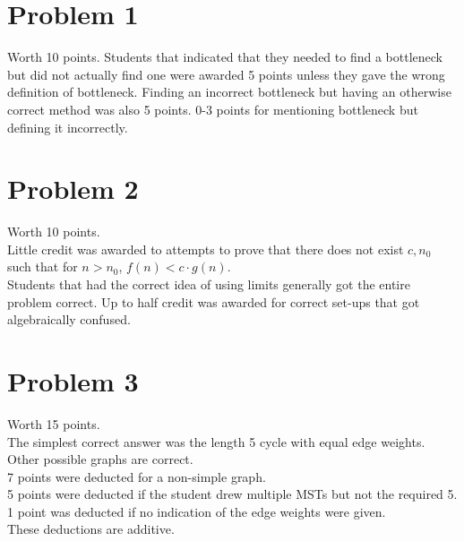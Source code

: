 \documentclass{article}
\begin{document}

\section*{Problem 1}
Worth 10 points. 
Students that indicated that they needed to find a bottleneck but did not actually find one were awarded 5 points unless they gave the wrong definition of bottleneck. Finding an incorrect bottleneck but having an otherwise correct method was also 5 points. 0-3 points for mentioning bottleneck but defining it incorrectly.

\section*{Problem 2}
Worth 10 points. \\
Little credit was awarded to attempts to prove that there does not exist $c, n_0$ such that for $n>n_0$, $f(n) < c\cdot g(n)$. \\
Students that had the correct idea of using limits generally got the entire problem correct. Up to half credit was awarded for correct set-ups that got algebraically confused. 


\section*{Problem 3}
Worth 15 points. \\
The simplest correct answer was the length 5 cycle with equal edge weights. Other possible graphs are correct. \\
7 points were deducted for a non-simple graph. \\
5 points were deducted if the student drew multiple MSTs but not the required 5. \\
1 point was deducted if no indication of the edge weights were given. \\
These deductions are additive. 
\end{document}
